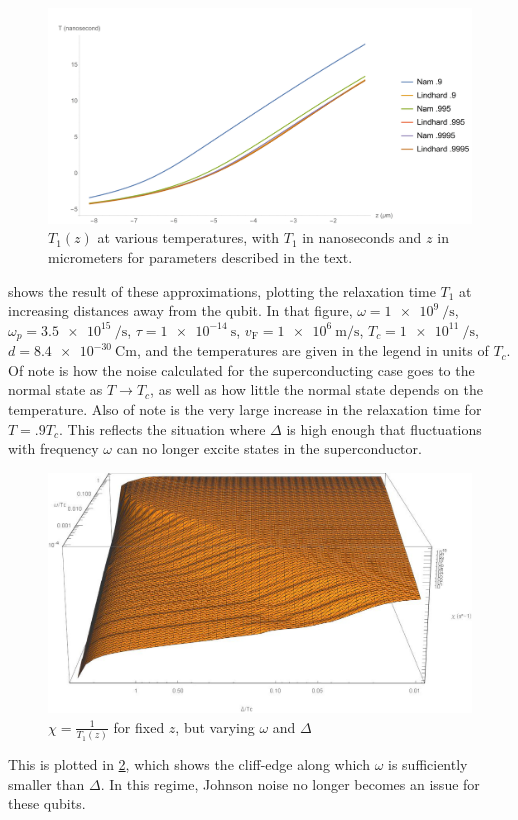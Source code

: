 \documentclass{article}
\newcommand{\vf}{v_{\mathrm{F}}}
\begin{document}
\begin{figure}[htp]
	\centering
	\includegraphics[width=12cm]{HighTempNam1}
	\caption{$T_1(z)$ at various temperatures, with $T_1$ in nanoseconds and $z$ in micrometers for parameters described in the text.} \label{fig:HighTempNam1}
\end{figure}
 shows the result of these approximations, plotting the relaxation time $T_1$ at increasing distances away from the qubit.
In that figure, $\omega = \SI{1e9}{\per\second}$, $\omega_p = \SI{3.5e15}{\per\second}$, $\tau = \SI{1e-14}{\second}$, $\vf = \SI{1e6}{\m\per\s}$, $T_c = \SI{1e11}{\per\s}$, $d = \SI{8.4e-30}{\coulomb\m}$, and the temperatures are given in the legend in units of $T_c$.
Of note is how the noise calculated for the superconducting case goes to the normal state as $T \rightarrow T_c$, as well as how little the normal state depends on the temperature.
Also of note is the very large increase in the relaxation time for $T = .9 T_c$.
This reflects the situation where $\Delta$ is high enough that fluctuations with frequency $\omega$ can no longer excite states in the superconductor.
\begin{figure}[htp]
	\centering
	\includegraphics[width=12cm]{namNoiseCliff}
	\caption{$\chi = \frac{1}{T_1(z)}$ for fixed $z$, but varying $\omega$ and $\Delta$} \label{fig:Cliff}
\end{figure}
This is plotted in \cref{fig:Cliff}, which shows the cliff-edge along which $\omega$ is sufficiently smaller than $\Delta$.
In this regime, Johnson noise no longer becomes an issue for these qubits.
\end{document}
